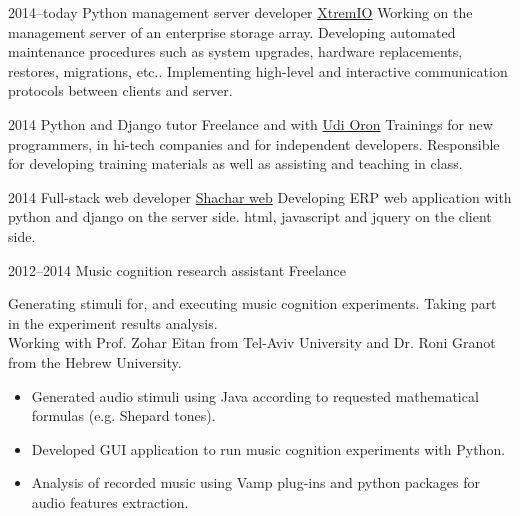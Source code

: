 \documentclass[]{friggeri-cv}  %
\begin{document}
\begin{entrylist}

    \entry
    {2014--today}
    {Python management server developer}
    {\href{http://xtremio.com/}{XtremIO}}
    {Working on the management server of an enterprise storage array.
     Developing automated maintenance procedures such as system upgrades, hardware replacements, restores, migrations, etc..
     Implementing high-level and interactive communication protocols between clients and server.}

\end{entrylist}
\begin{entrylist}

    \entry
    {2014}
    {Python and Django tutor}
    {Freelance and with \href{http://www.10x.org.il/}{Udi Oron}}
    {Trainings for new programmers, in hi-tech companies and for independent developers. Responsible for developing training materials as well as assisting and teaching in class.}

\end{entrylist}
\begin{entrylist}

    \entry
    {2014}
    {Full-stack web developer}
    {\href{http://www.shachar-web.co.il/}{Shachar web}}
    {Developing ERP web application with python and django on the server side. html, javascript and jquery on the client side.}

\end{entrylist}
\begin{entrylist}

    \entry
    {2012--2014}
    {Music cognition research assistant}
    {Freelance}
    {Generating stimuli for, and executing music cognition experiments. Taking part in the experiment results analysis.\\
    Working with Prof. Zohar Eitan from Tel-Aviv University and Dr. Roni Granot from the Hebrew University.
    \begin{itemize}
    \item Generated audio stimuli using Java according to requested mathematical formulas (e.g. Shepard tones).
    \item Developed GUI application to run music cognition experiments with Python.
    \item Analysis of recorded music using Vamp plug-ins and python packages for audio features extraction.
    \end{itemize}}

\end{entrylist}
\end{document}
